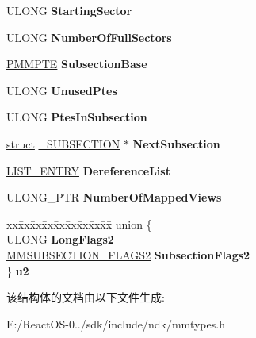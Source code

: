 \begin{DoxyCompactItemize}
\begin{tabbing}
\end{tabbing}\item 
\mbox{\label{struct___m_s_u_b_s_e_c_t_i_o_n_acd20416cfbd538e11b286f59f6e5f8cf}} 
U\+L\+O\+NG {\bfseries Starting\+Sector}
\item 
\mbox{\label{struct___m_s_u_b_s_e_c_t_i_o_n_a6e59d852d4b52f3506af2c09a1115e7a}} 
U\+L\+O\+NG {\bfseries Number\+Of\+Full\+Sectors}
\item 
\mbox{\label{struct___m_s_u_b_s_e_c_t_i_o_n_adbfbd1787c739f49461192725d33f6c8}} 
\hyperlink{struct___m_m_p_t_e}{P\+M\+M\+P\+TE} {\bfseries Subsection\+Base}
\item 
\mbox{\label{struct___m_s_u_b_s_e_c_t_i_o_n_a78f5a3c50b6094fb29e03aa942e0cd03}} 
U\+L\+O\+NG {\bfseries Unused\+Ptes}
\item 
\mbox{\label{struct___m_s_u_b_s_e_c_t_i_o_n_abc2e9296eadcbfc386ce025d724ba48f}} 
U\+L\+O\+NG {\bfseries Ptes\+In\+Subsection}
\item 
\mbox{\label{struct___m_s_u_b_s_e_c_t_i_o_n_aac3fe9c96ca96d0e5c08114051228a8e}} 
\hyperlink{interfacestruct}{struct} \hyperlink{struct___s_u_b_s_e_c_t_i_o_n}{\+\_\+\+S\+U\+B\+S\+E\+C\+T\+I\+ON} $\ast$ {\bfseries Next\+Subsection}
\item 
\mbox{\label{struct___m_s_u_b_s_e_c_t_i_o_n_a4d0ce37bb36f458a023d455702477105}} 
\hyperlink{struct___l_i_s_t___e_n_t_r_y}{L\+I\+S\+T\+\_\+\+E\+N\+T\+RY} {\bfseries Dereference\+List}
\item 
\mbox{\label{struct___m_s_u_b_s_e_c_t_i_o_n_a9254fc81b8b6b7cf7cba9208e3ab658e}} 
U\+L\+O\+N\+G\+\_\+\+P\+TR {\bfseries Number\+Of\+Mapped\+Views}
\item 
\mbox{\label{struct___m_s_u_b_s_e_c_t_i_o_n_afa8bf0e879fc3c5374683184ce254494}} 
\begin{tabbing}
xx\=xx\=xx\=xx\=xx\=xx\=xx\=xx\=xx\=\kill
union \{\\
\>ULONG {\bfseries LongFlags2}\\
\>\hyperlink{struct___m_m_s_u_b_s_e_c_t_i_o_n___f_l_a_g_s2}{MMSUBSECTION\_FLAGS2} {\bfseries SubsectionFlags2}\\
\} {\bfseries u2}\\

\end{tabbing}\end{DoxyCompactItemize}


该结构体的文档由以下文件生成\+:\begin{DoxyCompactItemize}
\item 
E\+:/\+React\+O\+S-\/0../sdk/include/ndk/mmtypes.\+h\end{DoxyCompactItemize}
